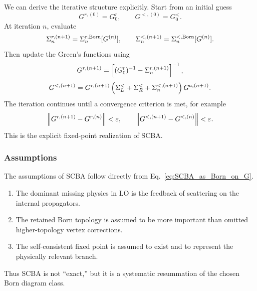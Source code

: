 We can derive the iterative structure explicitly. Start from an initial guess
\begin{equation}
    G^{r,(0)} = G_0^r,
    \qquad
    G^{<,(0)} = G_0^<.
    \label{eq:SCBA_initial_guess}
\end{equation}
At iteration $n$, evaluate
\begin{equation}
    \Sigma_n^{r,(n+1)} = \Sigma_n^{r,\rm Born}[G^{(n)}],
    \qquad
    \Sigma_n^{<,(n+1)} = \Sigma_n^{<,\rm Born}[G^{(n)}].
    \label{eq:SCBA_self_energy_update}
\end{equation}
Then update the Green's functions using
\begin{equation}
    G^{r,(n+1)} = \left[ (G_0^r)^{-1} - \Sigma_n^{r,(n+1)} \right]^{-1},
    \label{eq:SCBA_retarded_update}
\end{equation}
\begin{equation}
    G^{<,(n+1)} = G^{r,(n+1)}\left( \Sigma_L^< + \Sigma_R^< + \Sigma_n^{<,(n+1)} \right)G^{a,(n+1)}.
    \label{eq:SCBA_lesser_update}
\end{equation}
The iteration continues until a convergence criterion is met, for example
\begin{equation}
    \left\| G^{r,(n+1)} - G^{r,(n)} \right\| < \varepsilon,
    \qquad
    \left\| G^{<,(n+1)} - G^{<,(n)} \right\| < \varepsilon.
    \label{eq:SCBA_convergence_criterion}
\end{equation}
This is the explicit fixed-point realization of SCBA.

\subsubsection{Assumptions}
The assumptions of SCBA follow directly from Eq.~\eqref{eq:SCBA_as_Born_on_G}.
\begin{enumerate}[label=\arabic*.]
\item The dominant missing physics in LO is the feedback of scattering on the internal propagators.
\item The retained Born topology is assumed to be more important than omitted higher-topology vertex corrections.
\item The self-consistent fixed point is assumed to exist and to represent the physically relevant branch.
\end{enumerate}
Thus SCBA is not ``exact,'' but it is a systematic resummation of the chosen Born diagram class.

